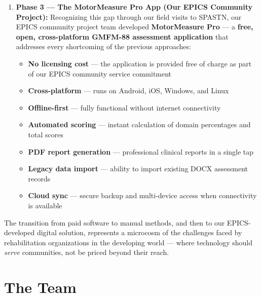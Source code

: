 \documentclass[11pt,a4paper]{article}
\begin{document}
\begin{enumerate}[leftmargin=2em, itemsep=4pt]
    \item \textbf{Phase 3 --- The MotorMeasure Pro App (Our EPICS Community Project):} Recognizing this gap through our field visits to SPASTN, our EPICS community project team developed \textbf{MotorMeasure Pro} --- a \textbf{free, open, cross-platform GMFM-88 assessment application} that addresses every shortcoming of the previous approaches:
    \begin{itemize}[leftmargin=1.5em, itemsep=2pt]
        \item \textbf{No licensing cost} --- the application is provided free of charge as part of our EPICS community service commitment
        \item \textbf{Cross-platform} --- runs on Android, iOS, Windows, and Linux
        \item \textbf{Offline-first} --- fully functional without internet connectivity
        \item \textbf{Automated scoring} --- instant calculation of domain percentages and total scores
        \item \textbf{PDF report generation} --- professional clinical reports in a single tap
        \item \textbf{Legacy data import} --- ability to import existing DOCX assessment records
        \item \textbf{Cloud sync} --- secure backup and multi-device access when connectivity is available
    \end{itemize}
\end{enumerate}

\begin{quotecallout}
The transition from paid software to manual methods, and then to our EPICS-developed digital solution, represents a microcosm of the challenges faced by rehabilitation organizations in the developing world --- where technology should \textit{serve} communities, not be priced beyond their reach.
\end{quotecallout}

\section{The Team}
\end{document}
